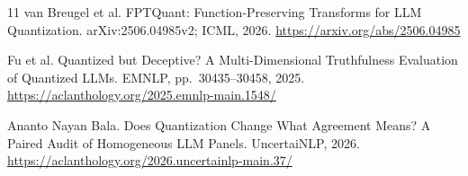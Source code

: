 \documentclass[11pt]{article}
\begin{document}
\begin{thebibliography}{11}
van Breugel et al. FPTQuant: Function-Preserving Transforms for LLM
Quantization. arXiv:2506.04985v2; ICML, 2026.
\url{https://arxiv.org/abs/2506.04985}

Fu et al. Quantized but Deceptive? A Multi-Dimensional Truthfulness Evaluation
of Quantized LLMs. EMNLP, pp.\ 30435--30458, 2025.
\url{https://aclanthology.org/2025.emnlp-main.1548/}

Ananto Nayan Bala. Does Quantization Change What Agreement Means? A Paired
Audit of Homogeneous LLM Panels. UncertaiNLP, 2026.
\url{https://aclanthology.org/2026.uncertainlp-main.37/}
\end{thebibliography}
\end{document}
